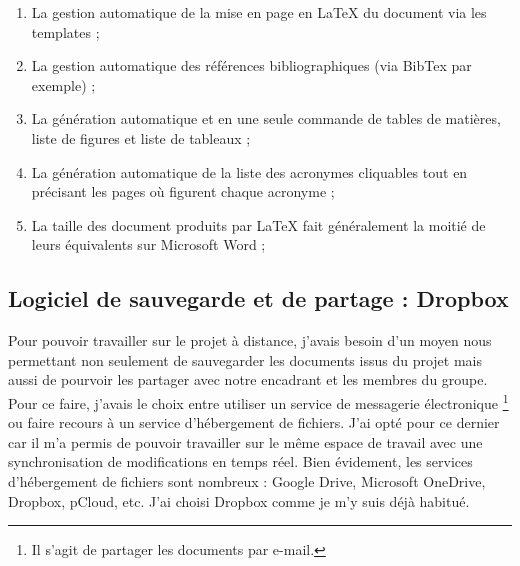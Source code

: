 \begin{enumerate}
	\item La gestion automatique de la mise en page en LaTeX du document via les templates ;
	\item La gestion automatique des références bibliographiques (via BibTex par exemple) ;
	\item La génération automatique et en une seule commande de tables de matières, liste de figures et liste de tableaux ;
	\item La génération automatique de la liste des acronymes cliquables tout en précisant les pages où figurent chaque acronyme ;
	\item La taille des document produits par LaTeX fait généralement la moitié de leurs équivalents sur Microsoft Word ;
\end{enumerate}

\subsection{Logiciel de sauvegarde et de partage : Dropbox}
Pour pouvoir travailler sur le projet à distance, j'avais besoin d’un moyen nous permettant non seulement de sauvegarder les documents issus du projet mais aussi de pourvoir les partager avec notre encadrant et les membres du groupe. Pour ce faire, j'avais le choix entre utiliser un service de messagerie électronique \footnote{Il s’agit de partager les documents par e-mail.} ou faire recours à un service d’hébergement de fichiers. J'ai opté pour ce dernier car il m'a permis de pouvoir travailler sur le même espace de travail avec une synchronisation de modifications en temps réel. \newline
Bien évidement, les services d’hébergement de fichiers sont nombreux : Google Drive, Microsoft OneDrive, Dropbox, pCloud, etc. J'ai choisi Dropbox comme je m'y suis déjà habitué.
